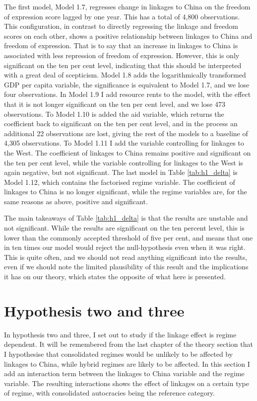 The first model, Model 1.7, regresses change in linkages to China on the freedom of expression score lagged by one year. This has a total of 4,800 observations. This configuration, in contrast to directly regressing the linkage and freedom scores on each other, shows a positive relationship between linkages to China and freedom of expression. That is to say that an increase in linkages to China is associated with less repression of freedom of expression. However, this is only significant on the ten per cent level, indicating that this should be interpreted with a great deal of scepticism. Model 1.8 adds the logarithmically transformed GDP per capita variable, the significance is equivalent to Model 1.7, and we lose four observations. In Model 1.9 I add resource rents to the model, with the effect that it is not longer significant on the ten per cent level, and we lose 473 observations. To Model 1.10 is added the aid variable, which returns the coefficient back to significant on the ten per cent level, and in the process an additional 22 observations are lost, giving the rest of the models to a baseline of 4,305 observations. To Model 1.11 I add the variable controlling for linkages to the West. The coefficient of linkages to China remains positive and significant on the ten per cent level, while the variable controlling for linkages to the West is again negative, but not significant. The last model in Table \ref{tab:h1_delta} is Model 1.12, which contains the factorised regime variable. The coefficient of linkages to China is no longer significant, while the regime variables are, for the same reasons as above, positive and significant.

The main takeaways of Table \ref{tab:h1_delta} is that the results are unstable and not significant. While the results are significant on the ten percent level, this is lower than the commonly accepted threshold of five per cent, and means that one in ten times our model would reject the null-hypothesis even when it was right. This is quite often, and we should not read anything significant into the results, even if we should note the limited plausibility of this result and the implications it has on our theory, which states the opposite of what here is presented.

\section{Hypothesis two and three} \label{sec:h2}
In hypothesis two and three, I set out to study if the linkage effect is regime dependent. It will be remembered from the last chapter of the theory section that I hypothesise that consolidated regimes would be unlikely to be affected by linkages to China, while hybrid regimes are likely to be affected. In this section I add an interaction term between the linkages to China variable and the regime variable. The resulting interactions shows the effect of linkages on a certain type of regime, with consolidated autocracies being the reference category.

